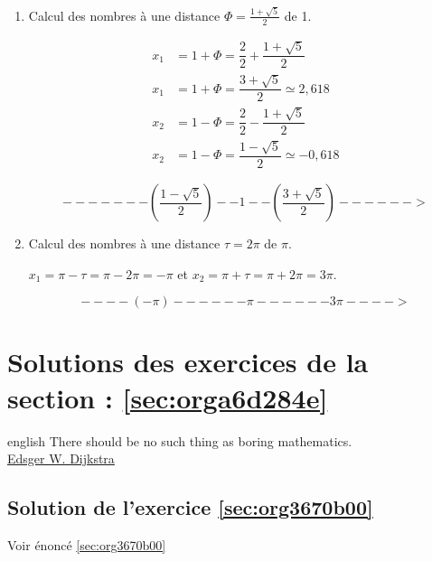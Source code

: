 \documentclass[a4paper, 11pt, twoside]{book}
\begin{document}
\begin{enumerate}
\item Calcul des nombres à une distance \(\Phi = \frac{1 +
       \sqrt{5}}{2}\) de 1. 

\begin{align*}
x_1 &= 1 + \Phi = \dfrac{2}{2} + \dfrac{1 + \sqrt{5}}{2} \\
x_1 &= 1 + \Phi = \dfrac{3 + \sqrt{5}}{2}\simeq 2,618 \\
x_2 &= 1 - \Phi = \dfrac{2}{2} - \dfrac{1 + \sqrt{5}}{2} \\
x_2 &= 1 - \Phi = \dfrac{1 - \sqrt{5}}{2}\simeq -0,618 
\end{align*}

\[-------\left(\dfrac{1 - \sqrt{5}}{2}\right)--1--\left(\dfrac{3 + \sqrt{5}}{2}\right)------>\]

\item Calcul des nombres à une distance \(\tau = 2\pi\) de \(\pi\).

\(x_1 = \pi - \tau = \pi - 2\pi = -\pi\) et \(x_2 = \pi + \tau =
       \pi + 2\pi = 3\pi\).

\[----(-\pi)------\pi------3\pi---->\]
\end{enumerate}
\stopcontents[level-2]

\chapter{Solutions des exercices de la section : \ref{sec:orga6d284e}}
\label{sec:org1836ca3}
\startcontents[level-2]

\begin{foreigndisplayquote}{english}
There should be no such thing as boring mathematics.\\

\href{https://en.wikipedia.org/wiki/Edsger\_W.\_Dijkstra}{Edsger W. Dijkstra}
\end{foreigndisplayquote}

\section{Solution de l'exercice \ref{sec:org3670b00}}
\label{sec:org8f5befd}
Voir énoncé \ref{sec:org3670b00}
\end{document}
